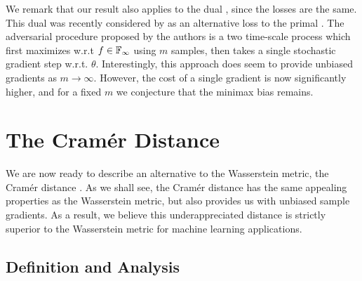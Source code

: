 \documentclass{article}
\begin{document}
We remark that our result also applies to the dual , since the losses are the same. This dual was recently considered by \citet{arjovsky17wasserstein} as an alternative loss to the primal .
The adversarial procedure proposed by the authors is a two time-scale process which first maximizes  w.r.t $f \in \mathbb{F}_\infty$ using $m$ samples, then takes a single stochastic gradient step w.r.t. $\theta$. Interestingly, this approach does seem to provide unbiased gradients as $m \to \infty$. However, the cost of a single gradient is now significantly higher, and for a fixed $m$ we conjecture that the minimax bias remains.

\section{The Cram\'er Distance}\label{sec:cramer_distance}

We are now ready to describe an alternative to the Wasserstein metric, the Cram{\'e}r distance \citep{szekely02estatistics, rizzo2016energy}. As we shall see, the Cram{\'e}r distance has the same appealing properties as the Wasserstein metric, but also provides us with unbiased sample gradients. As a result, we believe this underappreciated distance is strictly superior to the Wasserstein metric for machine learning applications.

\subsection{Definition and Analysis}
\end{document}
